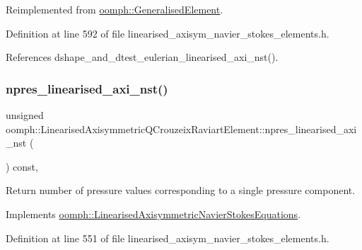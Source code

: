 Reimplemented from \hyperlink{classoomph_1_1GeneralisedElement_a0c6037a870597b35dcf1c780710b9a56}{oomph\+::\+Generalised\+Element}.



Definition at line 592 of file linearised\+\_\+axisym\+\_\+navier\+\_\+stokes\+\_\+elements.\+h.



References dshape\+\_\+and\+\_\+dtest\+\_\+eulerian\+\_\+linearised\+\_\+axi\+\_\+nst().

\mbox{\label{classoomph_1_1LinearisedAxisymmetricQCrouzeixRaviartElement_abeb1140cee07405cbaa6b3038e1ec2de}} 
\subsubsection{\texorpdfstring{npres\+\_\+linearised\+\_\+axi\+\_\+nst()}{npres\_linearised\_axi\_nst()}}
{\footnotesize\ttfamily unsigned oomph\+::\+Linearised\+Axisymmetric\+Q\+Crouzeix\+Raviart\+Element\+::npres\+\_\+linearised\+\_\+axi\+\_\+nst (\begin{DoxyParamCaption}{ }\end{DoxyParamCaption}) const\hspace{0.3cm}{\ttfamily [inline]}, {\ttfamily [virtual]}}



Return number of pressure values corresponding to a single pressure component. 



Implements \hyperlink{classoomph_1_1LinearisedAxisymmetricNavierStokesEquations_aad6f1582b4516aae4fe0ce3c9e2d16c2}{oomph\+::\+Linearised\+Axisymmetric\+Navier\+Stokes\+Equations}.



Definition at line 551 of file linearised\+\_\+axisym\+\_\+navier\+\_\+stokes\+\_\+elements.\+h.

\mbox{\label{classoomph_1_1LinearisedAxisymmetricQCrouzeixRaviartElement_ae89fb3e2f320a51ef7904b09a480ee89}} 
